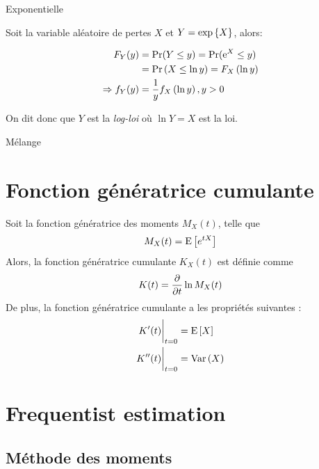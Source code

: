\documentclass[10pt, french]{article}
\begin{document}
\begin{multicols*}{3}
\begin{algo}{Exponentielle}

Soit la variable aléatoire de pertes $X$ et $Y = \text{exp}\left\{X\right\}$, alors:

\begin{align*}
	F_Y(y)
	&=	\Pr(Y \leq y)	
	=	\Pr(\mathrm{e}^{X} \leq y)	\\
	&=	\Pr\left(X \leq \ln y \right)	
	=	F_X\left(\ln y \right)	\\
\Rightarrow	f_Y(y)
	&=	\frac{1}{y} f_X\left(\ln y \right), y > 0
\end{align*}

On dit donc que $Y$ est la \textit{log-loi} où $\ln Y = X$ est la loi.

\end{algo}

\begin{algo}{Mélange}

\end{algo}

%

%

\setcounter{section}{8}

\section{Fonction génératrice cumulante}
Soit la fonction génératrice des moments $M_X(t)$, telle que
\[M_X(t) = \mathrm{E} \left[ e^{tX} \right]\]
Alors, la fonction génératrice cumulante $K_X(t)$ est définie comme
\[K(t) = \frac{\partial}{\partial t} \ln M_X(t)\]
De plus, la fonction génératrice cumulante a les propriétés suivantes : 
\begin{align*}
K'(t) \biggr \rvert_{t = 0} & =   \mathrm{E} \left[ X \right] \\
K''(t) \biggr \rvert_{t=0} & = \mathrm{Var} \left( X \right) \\
\end{align*}

\setcounter{section}{9}
\section{Frequentist estimation}
\subsection*{Méthode des moments}


\end{multicols*}
\end{document}
